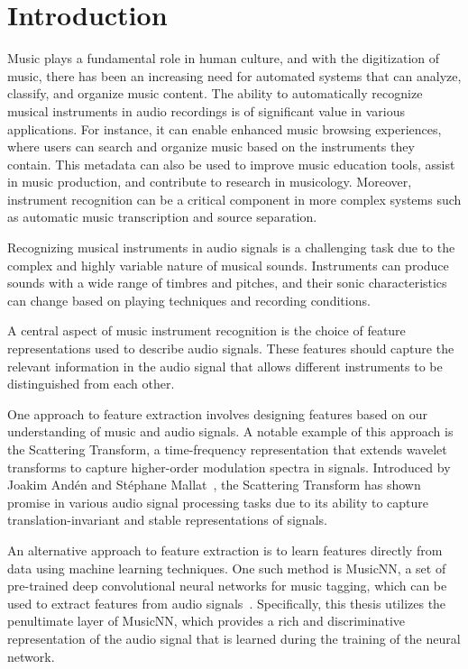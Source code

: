 \chapter{Introduction}
\label{ch:introduction}

Music plays a fundamental role in human culture, and with the digitization of music, there has been an increasing need for automated systems that can analyze, classify, and organize music content. The ability to automatically recognize musical instruments in audio recordings is of significant value in various applications. For instance, it can enable enhanced music browsing experiences, where users can search and organize music based on the instruments they contain. This metadata can also be used to improve music education tools, assist in music production, and contribute to research in musicology. Moreover, instrument recognition can be a critical component in more complex systems such as automatic music transcription and source separation.

Recognizing musical instruments in audio signals is a challenging task due to the complex and highly variable nature of musical sounds. Instruments can produce sounds with a wide range of timbres and pitches, and their sonic characteristics can change based on playing techniques and recording conditions.

A central aspect of music instrument recognition is the choice of feature representations used to describe audio signals. These features should capture the relevant information in the audio signal that allows different instruments to be distinguished from each other.

One approach to feature extraction involves designing features based on our understanding of music and audio signals. A notable example of this approach is the Scattering Transform, a time-frequency representation that extends wavelet transforms to capture higher-order modulation spectra in signals. Introduced by Joakim And\'{e}n and St\'{e}phane Mallat~\cite{anden2014deep}, the Scattering Transform has shown promise in various audio signal processing tasks due to its ability to capture translation-invariant and stable representations of signals.

An alternative approach to feature extraction is to learn features directly from data using machine learning techniques. One such method is MusicNN, a set of pre-trained deep convolutional neural networks for music tagging, which can be used to extract features from audio signals~\cite{pons2019musicnn}. Specifically, this thesis utilizes the penultimate layer of MusicNN, which provides a rich and discriminative representation of the audio signal that is learned during the training of the neural network.

